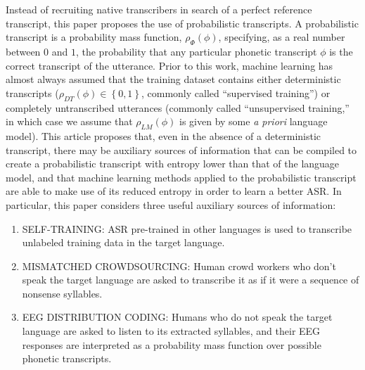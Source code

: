 Instead of recruiting native transcribers in search of a perfect
reference transcript, this paper proposes the use of probabilistic
transcripts.  A probabilistic transcript is a probability mass
function, $\rho_\Phi(\phi)$, specifying, as a real number between $0$ and
$1$, the probability that any particular phonetic transcript $\phi$
is the correct transcript of the utterance.  Prior to this work,
machine learning has almost always assumed that the training dataset
contains either deterministic transcripts
($\rho_{DT}(\phi)\in\left\{0,1\right\}$, commonly called ``supervised
training'') or completely untranscribed utterances (commonly called
``unsupervised training,'' in which case we assume that $\rho_{LM}(\phi)$
is given by some {\em a priori} language model).  This article
proposes that, even in the absence of a deterministic transcript,
there may be auxiliary sources of information that can be compiled to
create a probabilistic transcript with entropy lower than that
of the language model, and that machine learning methods applied to
the probabilistic transcript are able to make use of its reduced
entropy in order to learn a better ASR.  In particular,
this paper considers three useful auxiliary sources of information:
\begin{enumerate}
\item SELF-TRAINING: ASR pre-trained in other languages is used to
  transcribe unlabeled training data in the target language.
\item MISMATCHED CROWDSOURCING: Human crowd workers who don't speak
  the target language are asked to transcribe it as if it were a
  sequence of nonsense syllables.
\item EEG DISTRIBUTION CODING: Humans who do not speak the target
  language are asked to listen to its extracted syllables, and their
  EEG responses are interpreted as a probability mass function over
  possible phonetic transcripts.
\end{enumerate}


